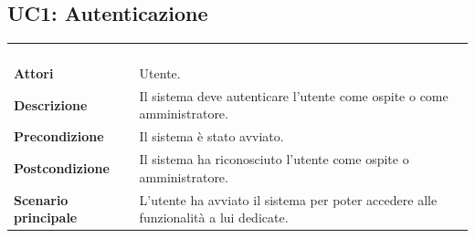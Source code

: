 \newpage
\subsection{UC1: Autenticazione}
\label{UC1}
\begin{longtable}{l|p{10cm}}
\rowcolor[gray]{0.8} \multicolumn{2}{c}{} \\
\rowcolor[gray]{0.8} \multicolumn{2}{c}{\textbf{UC1 - Autenticazione}} \\
\rowcolor[gray]{0.8} \multicolumn{2}{c}{} \\
\hline
&\\
\textbf{Attori} & Utente.\\[7pt]
\textbf{Descrizione} & Il sistema deve autenticare l'utente come ospite o come amministratore.\\[7pt]
\textbf{Precondizione} & Il sistema è stato avviato.\\[7pt]
\textbf{Postcondizione} & Il sistema ha riconosciuto l'utente come ospite o amministratore.\\[7pt]
\textbf{Scenario principale} &L'utente ha avviato il sistema per poter accedere alle funzionalità a lui dedicate.\\[7pt]\hline
\end{longtable}

